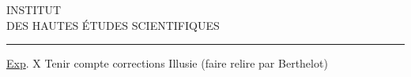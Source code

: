\begin{center}
INSTITUT\\
DES HAUTES ÉTUDES SCIENTIFIQUES\\[-.4ex]
\rule{1.4cm}{.4pt}
\end{center}

\uline{Exp}. X \qquad Tenir compte corrections  Illusie (faire relire par Berthelot)
